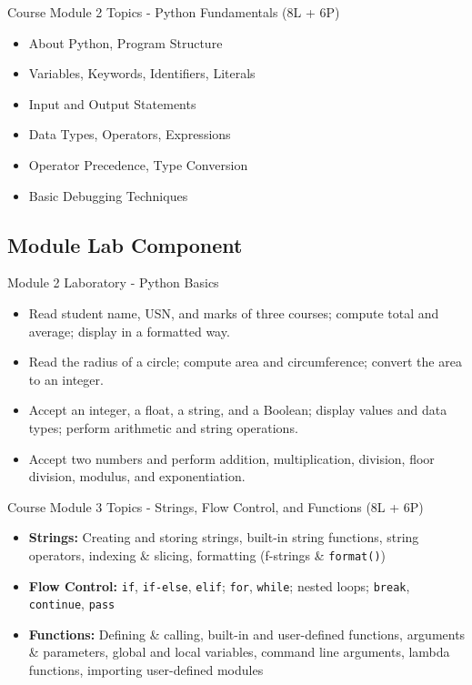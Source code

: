 \documentclass[aspectratio=169]{beamer}
\begin{document}
\begin{frame}{Course Module 2 Topics - Python Fundamentals (8L + 6P)}
\begin{itemize}
\item About Python, Program Structure
\item Variables, Keywords, Identifiers, Literals
\item Input and Output Statements
\item Data Types, Operators, Expressions
\item Operator Precedence, Type Conversion
\item Basic Debugging Techniques
\end{itemize}
\end{frame}

\subsection{Module Lab Component}
\begin{frame}{Module 2 Laboratory - Python Basics}
\begin{itemize}
\item Read student name, USN, and marks of three courses; compute total and average; display in a formatted way.
\item Read the radius of a circle; compute area and circumference; convert the area to an integer.
\item Accept an integer, a float, a string, and a Boolean; display values and data types; perform arithmetic and string operations.
\item Accept two numbers and perform addition, multiplication, division, floor division, modulus, and exponentiation.
\end{itemize}
\end{frame}

\begin{frame}{Course Module 3 Topics - Strings, Flow Control, and Functions (8L + 6P)}
\begin{itemize}
\item \textbf{Strings:} Creating and storing strings, built-in string functions, string operators, indexing \& slicing, formatting (f-strings \& \texttt{format()})
\item \textbf{Flow Control:} \texttt{if}, \texttt{if-else}, \texttt{elif}; \texttt{for}, \texttt{while}; nested loops; \texttt{break}, \texttt{continue}, \texttt{pass}
\item \textbf{Functions:} Defining \& calling, built-in and user-defined functions, arguments \& parameters, global and local variables, command line arguments, lambda functions, importing user-defined modules
\end{itemize}
\end{frame}
\end{document}
